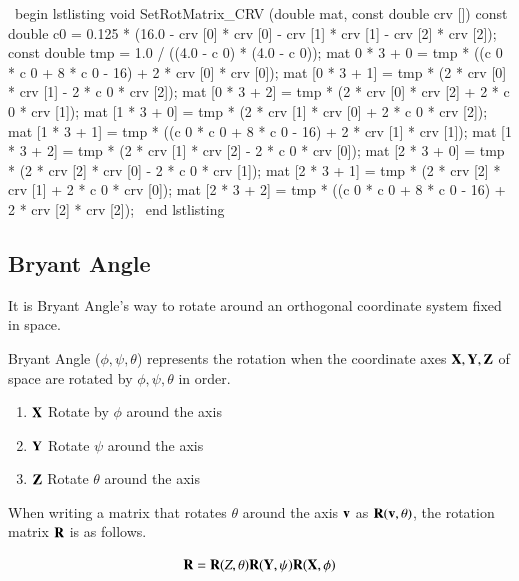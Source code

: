 \ begin {lstlisting}
void SetRotMatrix_CRV (double mat, const double crv []) {
  const double c0 = 0.125 * (16.0 - crv [0] * crv [0] - crv [1] * crv [1] - crv [2] * crv [2]);
  const double tmp = 1.0 / ((4.0 - c 0) * (4.0 - c 0));
  mat 0 * 3 + 0 = tmp * ((c 0 * c 0 + 8 * c 0 - 16) + 2 * crv [0] * crv [0]);
  mat [0 * 3 + 1] = tmp * (2 * crv [0] * crv [1] - 2 * c 0 * crv [2]);
  mat [0 * 3 + 2] = tmp * (2 * crv [0] * crv [2] + 2 * c 0 * crv [1]);
  mat [1 * 3 + 0] = tmp * (2 * crv [1] * crv [0] + 2 * c 0 * crv [2]);
  mat [1 * 3 + 1] = tmp * ((c 0 * c 0 + 8 * c 0 - 16) + 2 * crv [1] * crv [1]);
  mat [1 * 3 + 2] = tmp * (2 * crv [1] * crv [2] - 2 * c 0 * crv [0]);
  mat [2 * 3 + 0] = tmp * (2 * crv [2] * crv [0] - 2 * c 0 * crv [1]);
  mat [2 * 3 + 1] = tmp * (2 * crv [2] * crv [1] + 2 * c 0 * crv [0]);
  mat [2 * 3 + 2] = tmp * ((c 0 * c 0 + 8 * c 0 - 16) + 2 * crv [2] * crv [2]);
}
\ end {lstlisting}
\fi



\subsection{Bryant Angle}

It is Bryant Angle's way to rotate around an orthogonal coordinate system fixed in space.

Bryant Angle ($\phi,\psi,\theta$) represents the rotation when the coordinate axes $\mathbf{X},\mathbf{Y},\mathbf{Z}$ of space are rotated by $\phi,\psi,\theta$ in order.

\begin {enumerate}
\item $\mathbf{X}$ Rotate by $\phi$ around the axis
\item $\mathbf{Y}$ Rotate $\psi$ around the axis
\item $\mathbf{Z}$ Rotate $\theta$ around the axis
\end {enumerate}


When writing a matrix that rotates $\theta$ around the axis $\mathbf{v}$ as $\mathbf{R}(\mathbf{v},\theta)$, the rotation matrix $\mathbf{R}$ is as follows.

\begin{tcolorbox}[title=rotation matrix]
\begin{equation}
\mathbf{R} = \mathbf{R}(Z,\theta)\mathbf{R}(\mathbf{Y},\psi)\mathbf{R}(\mathbf{X},\phi)
\end{equation}
\end{tcolorbox}



